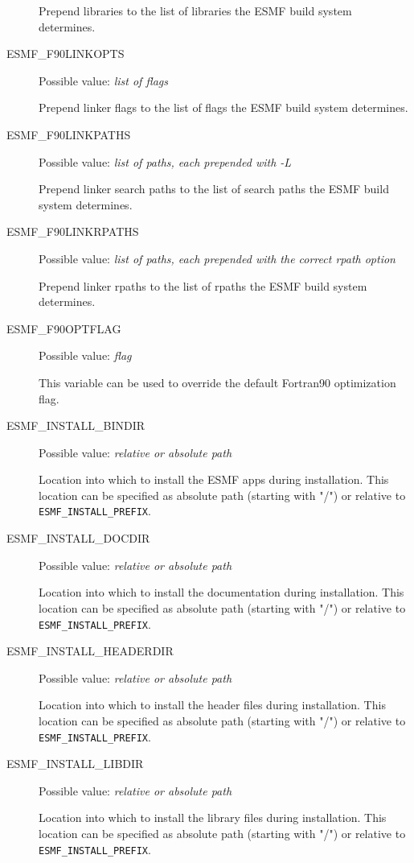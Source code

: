 \begin{description}
Prepend libraries to the list of libraries the ESMF build system determines.

\item[ESMF\_F90LINKOPTS]
Possible value: {\em list of flags}

Prepend linker flags to the list of flags the ESMF build system determines.

\item[ESMF\_F90LINKPATHS]
Possible value: {\em list of paths, each prepended with -L}

Prepend linker search paths to the list of search paths the ESMF build system
determines.

\item[ESMF\_F90LINKRPATHS]
Possible value: {\em list of paths, each prepended with the correct rpath option}

Prepend linker rpaths to the list of rpaths the ESMF build system determines.

\item[ESMF\_F90OPTFLAG]
Possible value: {\em flag}

This variable can be used to override the default  Fortran90 optimization flag.

\item[ESMF\_INSTALL\_BINDIR]
Possible value: {\em relative or absolute path}

Location into which to install the ESMF apps during installation. This
location can be specified as absolute path (starting with "/") or relative to
{\tt ESMF\_INSTALL\_PREFIX}.

\item[ESMF\_INSTALL\_DOCDIR]
Possible value: {\em relative or absolute path}

Location into which to install the documentation during installation. This
location can be specified as absolute path (starting with "/") or relative to
{\tt ESMF\_INSTALL\_PREFIX}.

\item[ESMF\_INSTALL\_HEADERDIR]
Possible value: {\em relative or absolute path}

Location into which to install the header files during installation. This
location can be specified as absolute path (starting with "/") or relative to
{\tt ESMF\_INSTALL\_PREFIX}.

\item[ESMF\_INSTALL\_LIBDIR]
Possible value: {\em relative or absolute path}

Location into which to install the library files during installation. This
location can be specified as absolute path (starting with "/") or relative to
{\tt ESMF\_INSTALL\_PREFIX}.


\end{description}
